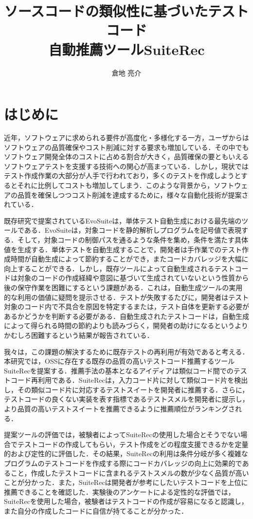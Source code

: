 \documentclass[12pt]{jarticle} %
\title{ソースコードの類似性に基づいたテストコード\\自動推薦ツールSuiteRec}
\author{倉地 亮介}
\begin{document}
%
%
\titlepage
\cmemberspage
\firstabstract
\secondabstract
%
%
\toc
\newpage
\listoffigures
\listoftables
%
%
\newpage
\section{はじめに}
近年，ソフトウェアに求められる要件が高度化・多様化する一方，ユーザからはソフトウェアの品質確保やコスト削減に対する要求も増加している\cite{tanno}．その中でもソフトウェア開発全体のコストに占める割合が大きく，品質確保の要ともいえるソフトウェアテストを支援する技術への関心が高まっている\cite{b20}．しかし，現状ではテスト作成作業の大部分が人手で行われており，多くのテストを作成しようとするとそれに比例してコストも増加してしまう．このような背景から，ソフトウェアの品質を確保しつつコスト削減を達成するために，様々な自動化技術が提案されている\cite{b19,EvoSuite,GRT,b17,T3}．

既存研究で提案されているEvoSuite\cite{EvoSuite}は，単体テスト自動生成における最先端のツールである．EvoSuiteは，対象コードを静的解析しプログラムを記号値で表現する．そして，対象コードの制御パスを通るような条件を集め，条件を満たす具体値を生成する．単体テストを自動生成することで，開発者は手作業でのテスト作成時間が自動生成によって節約することができ，またコードカバレッジを大幅に向上することができる．しかし，既存ツールによって自動生成されるテストコードは対象のコードの作成経緯や意図に基づいて生成されていないという性質から後の保守作業を困難にするという課題がある\cite{b14,b15,b13}．これは，自動生成ツールの実用的な利用の価値に疑問を提示させる．テストが失敗するたびに，開発者はテスト対象のコード内で不具合を原因を特定するまたは，テスト自体を更新する必要があるかどうかを判断する必要がある．自動生成されたテストコードは，自動生成によって得られる時間の節約よりも読みづらく，開発者の助けになるというよりかむしろ困難するという結果が報告されている\cite{b1}．

我々は，この課題の解決するために既存テストの再利用が有効であると考える．本研究では，OSSに存在する既存の品質の高いテストコード推薦するツール{\sf SuiteRec}を提案する．推薦手法の基本となるアイディアは類似コード間でのテストコード再利用である．{\sf SuiteRec}は，入力コード片に対して類似コード片を検出し，その類似コード片に対応するテストスイートを開発者に推薦する．さらに，テストコードの良くない実装を表す指標であるテストスメルを開発者に提示し，より品質の高いテストスイートを推薦できるように推薦順位がランキングされる．

提案ツールの評価では，被験者によって{\sf SuiteRec}の使用した場合とそうでない場合でテストコードの作成してもらい，テスト作成をどの程度支援できるかを定量的および定性的に評価した．その結果，{\sf SuiteRec}の利用は条件分岐が多く複雑なプログラムのテストコードを作成する際にコードカバレッジの向上に効果的であること，作成したテストコードに含まれるテストスメルの数が少なく品質が高いことが分かった．また，{\sf SuiteRec}は開発者が参考にしたいテストコードを上位に推薦できることを確認した．実験後のアンケートによる定性的な評価では，{\sf SuiteRec}を使用した場合，被験者はテストコードの作成が容易になると認識し，また自分の作成したコードに自信が持てることが分かった．
\end{document}
